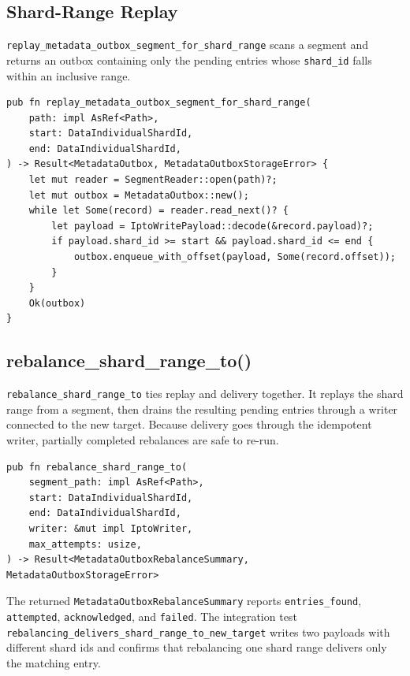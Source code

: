 \subsection{Shard-Range Replay}

\texttt{replay\_metadata\_outbox\_segment\_for\_shard\_range} scans a segment and
returns an outbox containing only the pending entries whose \texttt{shard\_id}
falls within an inclusive range.

\begin{lstlisting}
pub fn replay_metadata_outbox_segment_for_shard_range(
    path: impl AsRef<Path>,
    start: DataIndividualShardId,
    end: DataIndividualShardId,
) -> Result<MetadataOutbox, MetadataOutboxStorageError> {
    let mut reader = SegmentReader::open(path)?;
    let mut outbox = MetadataOutbox::new();
    while let Some(record) = reader.read_next()? {
        let payload = IptoWritePayload::decode(&record.payload)?;
        if payload.shard_id >= start && payload.shard_id <= end {
            outbox.enqueue_with_offset(payload, Some(record.offset));
        }
    }
    Ok(outbox)
}
\end{lstlisting}

\subsection{rebalance\_shard\_range\_to()}

\texttt{rebalance\_shard\_range\_to} ties replay and delivery together. It
replays the shard range from a segment, then drains the resulting pending
entries through a writer connected to the new \ipto{} target. Because delivery
goes through the idempotent writer, partially completed rebalances are safe to
re-run.

\begin{lstlisting}
pub fn rebalance_shard_range_to(
    segment_path: impl AsRef<Path>,
    start: DataIndividualShardId,
    end: DataIndividualShardId,
    writer: &mut impl IptoWriter,
    max_attempts: usize,
) -> Result<MetadataOutboxRebalanceSummary, MetadataOutboxStorageError>
\end{lstlisting}

The returned \texttt{MetadataOutboxRebalanceSummary} reports
\texttt{entries\_found}, \texttt{attempted}, \texttt{acknowledged}, and
\texttt{failed}. The integration test \texttt{rebalancing\_delivers\_shard\_range\_to\_new\_target}
writes two payloads with different shard ids and confirms that rebalancing one
shard range delivers only the matching entry.

